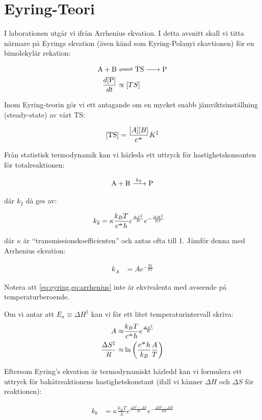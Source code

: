 \section{Eyring-Teori}
\label{sec:eyring}
I laborationen utgår vi ifrån Arrhenius ekvation. I detta avsnitt
skall vi titta närmare på Eyrings ekvation (även känd som Eyring-Polanyi ekavtionen)
för en bimolekylär rekation:

\begin{align}
  \label{eq:ts}
  \ce{A + B} & \ce{<=> TS -> P} \\
  \label{eq:dpdt-propto}
  \frac{d[\ce{P}]}{dt} &\propto [TS]
\end{align}

Inom Eyring-teorin gör vi ett antagande om en mycket snabb
jämviktsinställning (steady-state) av vårt TS:

\begin{equation}
  \label{eq:ts-conc}
  [\ce{TS}] = \frac{[A][B]}{c^\plimsoll}K^\ddagger
\end{equation}

Från statistisk termodynamik kan vi härleda ett uttryck för
hastighetskonsanten för totalreaktionen:

\begin{align}
  \ce{A + B ->[k_2] P}
\end{align}

där $k_2$ då ges av:

\begin{align}
  \label{eq:eyring}
  k_2 &= \kappa \frac{k_B T}{c^{-\kern-5pt{\circ}\kern-5pt-} h} e^{\frac{\Delta S^\ddagger}{R}} e^{-\frac{\Delta H^\ddagger}{RT}}
\end{align}

där $\kappa$ är ``transmissionskoefficienten'' och antas ofta till 1.
Jämför denna med Arrhenius ekvation:

\begin{align}
  \label{eq:arrhenius}
  k_A &= A e^{-\frac{Ea}{RT}}
\end{align}

Notera att \cref{eq:eyring,eq:arrhenius} inte är ekvivalenta med avseende
på temperaturberoende. 

Om vi antar att $E_a \equiv \Delta H^\ddagger$ kan vi för ett litet
temperaturintervall skriva:
\begin{align}
  A \approx& \frac{k_B T}{c^{-\kern-5pt{\circ}\kern-5pt-} h} e^{\frac{\Delta S^\ddagger}{R}}\\
  \frac{\Delta S^\ddagger}{R} \approx& \ln\left(\frac{c^{-\kern-5pt{\circ}\kern-5pt-} h}{k_B}
                                       \frac{A}{T}\right) 
\end{align}

Eftersom Eyring's ekvation är termodynamiskt härledd kan vi formulera ett
uttryck för bakåtreaktionens hastighetskonstant (ifall vi känner $\Delta H$ och $\Delta S$
för reaktionen):

\begin{align}
  k_b &= \kappa \frac{k_B T}{h} e^{\frac{\Delta S^\ddagger - \Delta S}{R}}
        e^{-\frac{\Delta H^\ddagger - \Delta H}{RT}}
\end{align}

